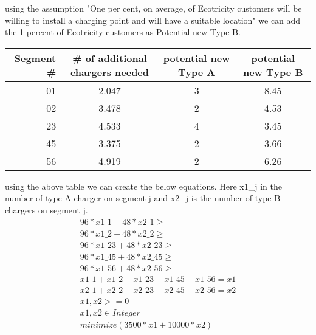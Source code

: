 \documentclass[12pt,letterpaper]{article}
\begin{document}
\begin{itemize}
\begin{center}
\begin{tabular}{r|cc}
            \end{tabular}
        \end{center}
        using the assumption "One per cent, on average, of Ecotricity customers will be willing to install a charging point and will have a suitable location" we can add the 1 percent of Ecotricity customers as Potential new Type B.
        \begin{center}
            \begin{tabular}{r|ccc}
                 Segment \# & \# of additional chargers needed & potential new Type A & potential new Type B \\ \hline
                 01 & 2.047 & 3 &  8.45 \\
                 02 & 3.478 & 2 &  4.53 \\ 
                 23 & 4.533 & 4 &  3.45 \\
                 45 & 3.375 & 2 &  3.66 \\
                 56 & 4.919 & 2 &  6.26 \\
            \end{tabular}
        \end{center}
        
        using the above table we can create the below equations. Here x1\_j in the number of type A charger on segment j  and x2\_j is the number of type B chargers on segment j.
        \begin{align}
            96*x1\_1 + 48*x2\_1 \ge \\
            96*x1\_2 + 48*x2\_2 \ge \\
            96*x1\_23 + 48*x2\_23 \ge \\
            96*x1\_45 + 48*x2\_45 \ge \\
            96*x1\_56 + 48*x2\_56 \ge \\ 
            x1\_1 + x1\_2 + x1\_23 + x1\_45 + x1\_56 = x1 \\
            x2\_1 + x2\_2 + x2\_23 + x2\_45 + x2\_56 = x2 \\
            x1, x2 >= 0 \\
            x1, x2 \in Integer \\
            minimize (3500*x1 + 10000*x2)
        \end{align}
\end{itemize}

\newpage
\end{document}
